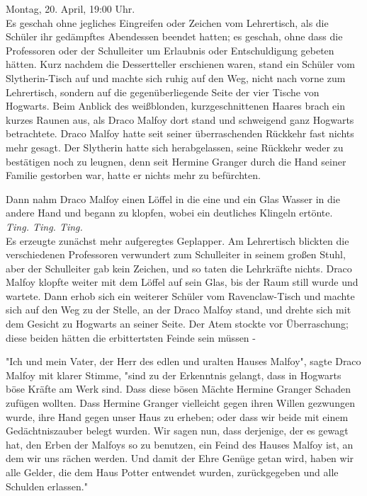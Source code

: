 {Montag, 20. April, 19:00 Uhr.\\ Es geschah ohne jegliches Eingreifen oder Zeichen vom Lehrertisch, als die Schüler ihr gedämpftes Abendessen beendet hatten; es geschah, ohne dass die Professoren oder der Schulleiter um Erlaubnis oder Entschuldigung gebeten hätten. Kurz nachdem die Dessertteller erschienen waren, stand ein Schüler vom Slytherin-Tisch auf und machte sich ruhig auf den Weg, nicht nach vorne zum Lehrertisch, sondern auf die gegenüberliegende Seite der vier Tische von Hogwarts. Beim Anblick des weißblonden, kurzgeschnittenen Haares brach ein kurzes Raunen aus, als Draco Malfoy dort stand und schweigend ganz Hogwarts betrachtete. Draco Malfoy hatte seit seiner überraschenden Rückkehr fast nichts mehr gesagt. Der Slytherin hatte sich herabgelassen, seine Rückkehr weder zu bestätigen noch zu leugnen, denn seit Hermine Granger durch die Hand seiner Familie gestorben war, hatte er nichts mehr zu befürchten.

Dann nahm Draco Malfoy einen Löffel in die eine und ein Glas Wasser in die andere Hand und begann zu klopfen, wobei ein deutliches Klingeln ertönte.\\ \emph{Ting. Ting. Ting.}\\ Es erzeugte zunächst mehr aufgeregtes Geplapper. Am Lehrertisch blickten die verschiedenen Professoren verwundert zum Schulleiter in seinem großen Stuhl, aber der Schulleiter gab kein Zeichen, und so taten die Lehrkräfte nichts. Draco Malfoy klopfte weiter mit dem Löffel auf sein Glas, bis der Raum still wurde und wartete. Dann erhob sich ein weiterer Schüler vom Ravenclaw-Tisch und machte sich auf den Weg zu der Stelle, an der Draco Malfoy stand, und drehte sich mit dem Gesicht zu Hogwarts an seiner Seite. Der Atem stockte vor Überraschung; diese beiden hätten die erbittertsten Feinde sein müssen -

"Ich und mein Vater, der Herr des edlen und uralten Hauses Malfoy", sagte Draco Malfoy mit klarer Stimme, "sind zu der Erkenntnis gelangt, dass in Hogwarts böse Kräfte am Werk sind. Dass diese bösen Mächte Hermine Granger Schaden zufügen wollten. Dass Hermine Granger vielleicht gegen ihren Willen gezwungen wurde, ihre Hand gegen unser Haus zu erheben; oder dass wir beide mit einem Gedächtniszauber belegt wurden. Wir sagen nun, dass derjenige, der es gewagt hat, den Erben der Malfoys so zu benutzen, ein Feind des Hauses Malfoy ist, an dem wir uns rächen werden. Und damit der Ehre Genüge getan wird, haben wir alle Gelder, die dem Haus Potter entwendet wurden, zurückgegeben und alle Schulden erlassen."

}
